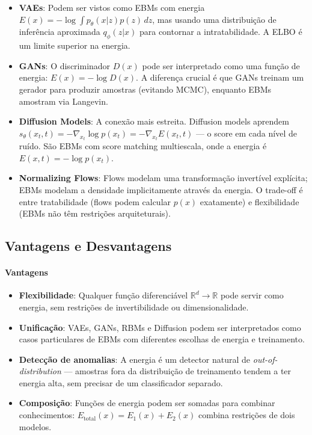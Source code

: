 \documentclass{tufte-handout}
\let\subsubsection\subsection
\begin{document}
\begin{itemize}
    \item \textbf{VAEs}: Podem ser vistos como EBMs com energia $E(x) = -\log \int p_\theta(x|z)p(z) \, dz$, mas usando uma distribuição de inferência aproximada $q_\phi(z|x)$ para contornar a intratabilidade. A ELBO é um limite superior na energia.
    \item \textbf{GANs}: O discriminador $D(x)$ pode ser interpretado como uma função de energia: $E(x) = -\log D(x)$. A diferença crucial é que GANs treinam um gerador para produzir amostras (evitando MCMC), enquanto EBMs amostram via Langevin.
    \item \textbf{Diffusion Models}: A conexão mais estreita. Diffusion models aprendem $s_\theta(x_t, t) = -\nabla_{x_t} \log p(x_t) = -\nabla_{x_t} E(x_t, t)$ --- o score em cada nível de ruído. São EBMs com score matching multiescala, onde a energia é $E(x, t) = -\log p(x_t)$.
    \item \textbf{Normalizing Flows}: Flows modelam uma transformação invertível explícita; EBMs modelam a densidade implicitamente através da energia. O trade-off é entre tratabilidade (flows podem calcular $p(x)$ exatamente) e flexibilidade (EBMs não têm restrições arquiteturais).
\end{itemize}

\subsubsection{Vantagens e Desvantagens}

\paragraph{Vantagens}
\begin{itemize}
    \item \textbf{Flexibilidade}: Qualquer função diferenciável $\mathbb{R}^d \rightarrow \mathbb{R}$ pode servir como energia, sem restrições de invertibilidade ou dimensionalidade.
    \item \textbf{Unificação}: VAEs, GANs, RBMs e Diffusion podem ser interpretados como casos particulares de EBMs com diferentes escolhas de energia e treinamento.
    \item \textbf{Detecção de anomalias}: A energia é um detector natural de \textit{out-of-distribution} --- amostras fora da distribuição de treinamento tendem a ter energia alta, sem precisar de um classificador separado.
    \item \textbf{Composição}: Funções de energia podem ser somadas para combinar conhecimentos: $E_{\text{total}}(x) = E_1(x) + E_2(x)$ combina restrições de dois modelos.
\end{itemize}
\end{document}
